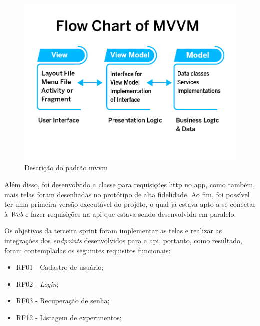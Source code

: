 \begin{figure}[H]
\centering
  \includegraphics[width=\columnwidth/2]{images/MVVM-architecture.jpg}
  \caption{Descrição do padrão \ac{mvvm}}
  \label{fig:MVVM-architecture}
\end{figure}

Além disso, foi desenvolvido a classe para requisições \ac{http} no \ac{app}, como também, mais telas foram desenhadas no protótipo de alta fidelidade. Ao fim, foi possível ter uma primeira versão executável do projeto, o qual já estava apto a se conectar à \textit{Web} e fazer requisições na \ac{api} que estava sendo desenvolvida em paralelo. 

Os objetivos da terceira sprint foram implementar as telas e realizar as integrações dos \textit{endpoints} desenvolvidos para a \ac{api}, portanto, como resultado, foram contempladas os seguintes requisitos funcionais:
\begin{itemize}
   \item RF01 - Cadastro de usuário;
   \item RF02 - \textit{Login};
   \item RF03 - Recuperação de senha;
   \item RF12 - Listagem de experimentos;
 \end{itemize}

